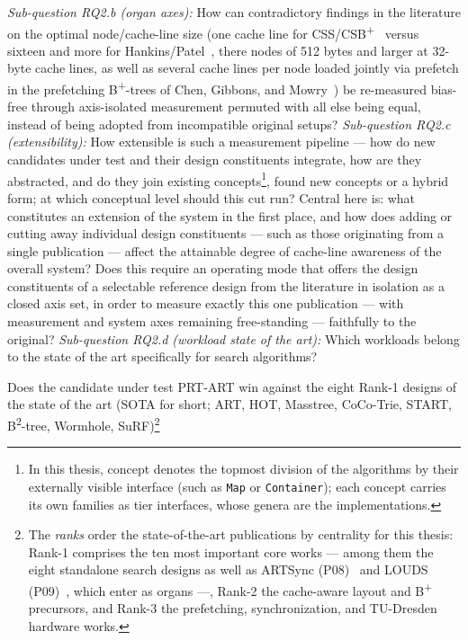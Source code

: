 \begin{description}
  \emph{Sub-question RQ2.b (organ axes):} How can contradictory findings in the literature on the optimal
  node/cache-line size (one cache line for CSS/CSB\textsuperscript{+}~\cite{rao1999css, rao2000csb}
  versus sixteen and more for Hankins/Patel~\cite{hankins2003nodesize}, there nodes of 512 bytes and
  larger at 32-byte cache lines, as well as several cache lines per node loaded jointly via prefetch
  in the prefetching B\textsuperscript{+}-trees of Chen, Gibbons, and Mowry~\cite{chen2001prefetch})
  be re-measured bias-free through axis-isolated measurement
  permuted with all else being equal,
  instead of being adopted from incompatible original setups?
  \emph{Sub-question RQ2.c (extensibility):} How extensible is such a measurement pipeline --- how do
  new candidates under test and their design constituents integrate, how are they abstracted, and do they
  join existing concepts\footnote{In this thesis, concept denotes the topmost
  division of the algorithms by their externally visible interface (such as \texttt{Map} or
  \texttt{Container}); each concept carries its own families as tier interfaces, whose genera are
  the implementations.},
  found new concepts or a
  hybrid form; at which conceptual level should this cut run? Central here is:
  what constitutes an extension of the system in the first place, and how does adding or
  cutting away individual design constituents --- such as those originating from a single
  publication --- affect the attainable degree of cache-line awareness of the
  overall system? Does this require
  an operating mode that offers the design constituents of a selectable reference design from the
  literature in isolation as a closed axis set, in order to measure exactly this one publication
  --- with measurement and system axes remaining free-standing --- faithfully to the original?
  \emph{Sub-question RQ2.d (workload state of the art):} Which workloads belong to the state of the art
  specifically for search algorithms?
  \item[RQ3 (Candidate comparison)] Does the candidate under test PRT-ART win against the eight Rank-1 designs
  of the state of the art (SOTA for short; ART, HOT, Masstree, CoCo-Trie, START,
  B\textsuperscript{2}-tree, Wormhole,
  SuRF)\footnote{The \emph{ranks} order the state-of-the-art publications by centrality for this thesis: Rank-1 comprises the ten most important core works --- among them the eight standalone search designs as well as ARTSync (P08)~\cite{leis2016olc} and LOUDS (P09)~\cite{jacobson1989louds}, which enter as organs ---, Rank-2 the cache-aware layout and B\textsuperscript{+} precursors, and Rank-3 the prefetching, synchronization, and TU-Dresden hardware works.}

\end{description}
